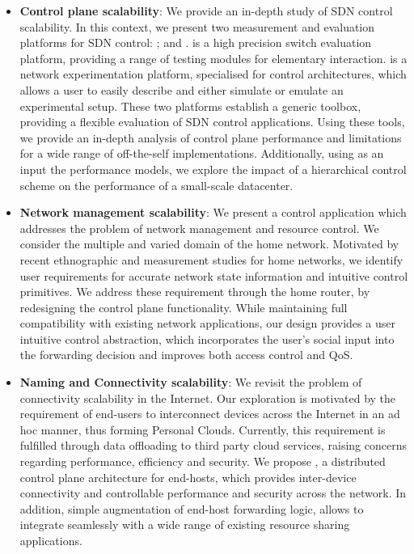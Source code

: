 \begin{itemize}
  \item \textbf{Control plane scalability}: We provide an in-depth study of SDN
  control scalability. In this context, we present two measurement and
  evaluation platforms for SDN control: \oflops; and \sdnsim. \oflops is a high
  precision switch evaluation platform, providing a range of testing modules
  for elementary \of interaction. \sdnsim is a network experimentation
  platform, specialised for \of control architectures, which allows a user to
  easily describe and either simulate or emulate an experimental setup. These
  two platforms establish a generic toolbox, providing a flexible evaluation of
  SDN control applications. Using these tools, we provide an in-depth analysis
  of control plane performance and limitations for a  wide range of
  off-the-self \of implementations. Additionally, using as an input the
  \oflops performance models, we explore the impact of a hierarchical
  control  scheme on the performance of a small-scale datacenter. 
 
  \item \textbf{Network management scalability}: We present a control
  application which addresses the problem of network management and resource
  control. We consider the multiple and varied domain of the home network.
  Motivated by recent ethnographic and measurement studies for home networks,
  we identify user requirements for accurate network state information and
  intuitive control primitives. We address these requirement through the home
  router, by redesigning the control plane functionality.  While maintaining
  full compatibility with existing network applications, our design provides a
  user intuitive control abstraction, which incorporates the user's social
  input into the forwarding decision and improves both access control and QoS.

  \item \textbf{Naming and Connectivity scalability}: We revisit the problem of
  connectivity scalability in the Internet.  Our exploration is motivated by
  the requirement of end-users to interconnect devices across the Internet in
  an ad hoc manner, thus forming Personal Clouds. Currently, this requirement
  is fulfilled through data offloading to third party cloud services, raising
  concerns regarding performance, efficiency and security.  We propose
  \signpost, a distributed control plane architecture for end-hosts, which
  provides inter-device connectivity and controllable performance and security
  across the network. In addition, simple augmentation of end-host forwarding
  logic, allows \signpost to integrate seamlessly with a wide range of existing
  resource sharing applications.
\end{itemize}


